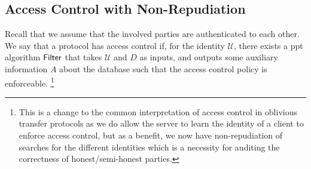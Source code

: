 \subsection*{\thesubsection\quad Access Control with Non-Repudiation}\label{subsec:AccessControl}

Recall that we assume that the involved parties are authenticated to each other. We say that a protocol has access control if, for the identity $ \mathcal{U} $, there exists a \acrshort{ppt} algorithm $ \mathsf{{Filter}} $ that takes $ \mathcal{U} $ and $ D $ as inputs, and outputs some auxiliary information $ A $ about the database such that the access control policy is enforceable. \footnote{This is a change to the common interpretation of access control in oblivious transfer protocols as we do allow the server to learn the identity of a client to enforce access control, but as a benefit, we now have non-repudiation of searches for the different identities which is a necessity for auditing the correctness of honest/semi-honest parties.}
